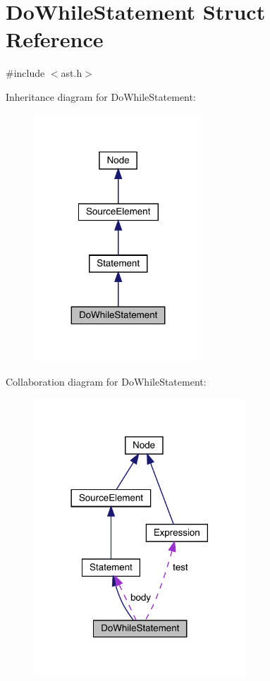 \hypertarget{struct_do_while_statement}{}\section{Do\+While\+Statement Struct Reference}
\label{struct_do_while_statement}


{\ttfamily \#include $<$ast.\+h$>$}



Inheritance diagram for Do\+While\+Statement\+:
\nopagebreak
\begin{figure}[H]
\begin{center}
\leavevmode
\includegraphics[width=179pt]{struct_do_while_statement__inherit__graph}
\end{center}
\end{figure}


Collaboration diagram for Do\+While\+Statement\+:
\nopagebreak
\begin{figure}[H]
\begin{center}
\leavevmode
\includegraphics[width=225pt]{struct_do_while_statement__coll__graph}
\end{center}
\end{figure}
